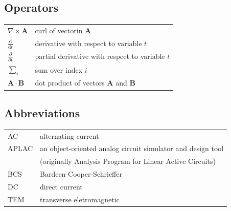 \documentclass[english,12pt,a4paper,pdftex,sci,utf8]{aaltothesis}
\begin{document}
\subsection*{Operators}

\begin{tabular}{ll}
$\nabla \times \mathbf{A}$              & curl of vectorin $\mathbf{A}$\\
$\displaystyle\frac{\mbox{d}}{\mbox{d} t}$ & derivative with respect to 
variable $t$\\[3mm]
$\displaystyle\frac{\partial}{\partial t}$  & partial derivative with respect 
to variable $t$ \\[3mm]
$\sum_i $                       & sum over index $i$\\
$\mathbf{A} \cdot \mathbf{B}$    & dot product of vectors $\mathbf{A}$ and 
$\mathbf{B}$
\end{tabular}

\subsection*{Abbreviations}

\begin{tabular}{ll}
AC         & alternating current \\
APLAC      & an object-oriented analog circuit simulator and design tool \\
           & (originally Analysis Program for Linear Active Circuits) \\
BCS        & Bardeen-Cooper-Schrieffer \\ %
DC         & direct current \\
TEM        & transverse eletromagnetic
\end{tabular}


\cleardoublepage
\storeinipagenumber
{}
\setcounter{page}{1}


\end{document}
